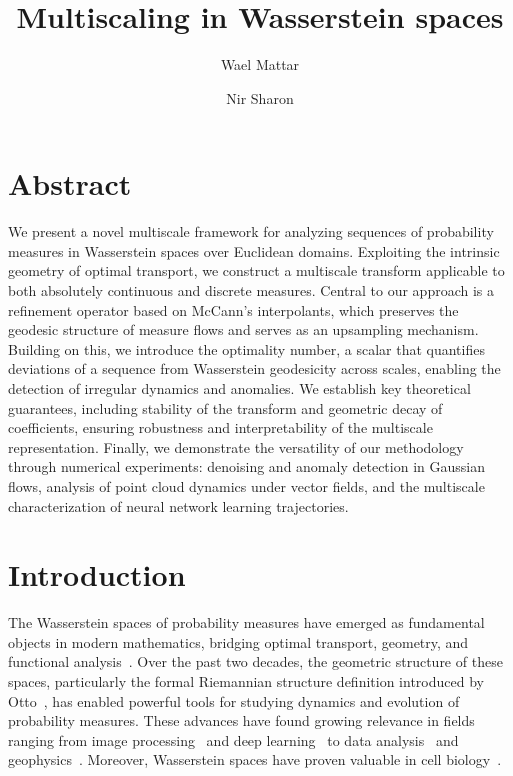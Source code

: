 \documentclass[12pt]{amsart}
\title[Multiscaling in Wasserstein spaces]{Multiscaling in Wasserstein spaces}
\author[W. Mattar]{Wael Mattar}
\author[N. Sharon]{Nir Sharon}
\begin{document}
\maketitle

\section*{Abstract}
We present a novel multiscale framework for analyzing sequences of probability measures in Wasserstein spaces over Euclidean domains. Exploiting the intrinsic geometry of optimal transport, we construct a multiscale transform applicable to both absolutely continuous and discrete measures. Central to our approach is a refinement operator based on McCann’s interpolants, which preserves the geodesic structure of measure flows and serves as an upsampling mechanism. Building on this, we introduce the optimality number, a scalar that quantifies deviations of a sequence from Wasserstein geodesicity across scales, enabling the detection of irregular dynamics and anomalies. We establish key theoretical guarantees, including stability of the transform and geometric decay of coefficients, ensuring robustness and interpretability of the multiscale representation. Finally, we demonstrate the versatility of our methodology through numerical experiments: denoising and anomaly detection in Gaussian flows, analysis of point cloud dynamics under vector fields, and the multiscale characterization of neural network learning trajectories.

\section{Introduction}

The Wasserstein spaces of probability measures have emerged as fundamental objects in modern mathematics, bridging optimal transport, geometry, and functional analysis~\cite{ambrosio2008gradient, villani2021topics, santambrogio2015optimal, panaretos2020invitation}. Over the past two decades, the geometric structure of these spaces, particularly the formal Riemannian structure definition introduced by Otto~\cite{Otto31012001}, has enabled powerful tools for studying dynamics and evolution of probability measures. These advances have found growing relevance in fields ranging from image processing~\cite{rabin2011wasserstein} and deep learning~\cite{gulrajani2017improved} to data analysis~\cite{bigot2020statistical, peyre2019computational} and geophysics~\cite{yang2018application}. Moreover, Wasserstein spaces have proven valuable in cell biology~\cite{demetci2020gromov, klein2024genot, chen2025fast, banerjee2024efficient, schiebinger2019optimal}.
\end{document}
